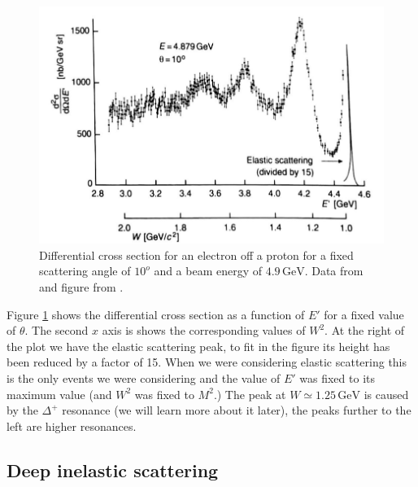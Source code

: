 \documentclass[12pt]{article}
\begin{document}
\begin{figure}[h]
\begin{center}
\includegraphics[scale=0.5]{images/inelasticScatteringeP.png}
\end{center}
\caption{Differential cross section for an electron off a proton for a fixed scattering angle of $10^o$ and a beam energy of $4.9\,\mbox{GeV}$. Data from \cite{Bartel:1968tw} and figure from \cite{povh}.}\label{fig:DISspectrum}
\end{figure}
%
Figure \ref{fig:DISspectrum} shows the differential cross section as a function of $E'$ for a fixed value of $\theta$. The second $x$ axis is shows the corresponding values of $W^2$. At the right of the plot we have the elastic scattering peak, to fit in the figure its height has been reduced by a factor of 15. When we were considering elastic scattering this is the only events we were considering and the value of $E'$ was fixed to its maximum value (and $W^2$ was fixed to $M^2$.) The peak at $W\simeq 1.25\,\mbox{GeV}$ is caused by the $\Delta^+$ resonance (we will learn more about it later), the peaks further to the left are higher resonances.  

%
%
 \subsection{Deep inelastic scattering}
%
%
%
\end{document}
